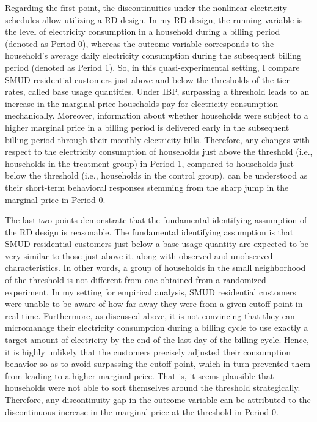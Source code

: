 Regarding the first point, the discontinuities under the nonlinear electricity schedules allow utilizing a RD design. In my RD design, the running variable is the level of electricity consumption in a household during a billing period (denoted as Period 0), whereas the outcome variable corresponds to the household's average daily electricity consumption during the subsequent billing period (denoted as Period 1). So, in this quasi-experimental setting, I compare SMUD residential customers just above and below the thresholds of the tier rates, called base usage quantities. Under IBP, surpassing a threshold leads to an increase in the marginal price households pay for electricity consumption mechanically. Moreover, information about whether households were subject to a higher marginal price in a billing period is delivered early in the subsequent billing period through their monthly electricity bills. Therefore, any changes with respect to the electricity consumption of households just above the threshold (i.e., households in the treatment group) in Period 1, compared to households just below the threshold (i.e., households in the control group), can be understood as their short-term behavioral responses stemming from the sharp jump in the marginal price in Period 0. 

The last two points demonstrate that the fundamental identifying assumption of the RD design is reasonable. The fundamental identifying assumption is that SMUD residential customers just below a base usage quantity are expected to be very similar to those just above it, along with observed and unobserved characteristics. In other words, a group of households in the small neighborhood of the threshold is not different from one obtained from a randomized experiment. In my setting for empirical analysis, SMUD residential customers were unable to be aware of how far away they were from a given cutoff point in real time. Furthermore, as discussed above, it is not convincing that they can micromanage their electricity consumption during a billing cycle to use exactly a target amount of electricity by the end of the last day of the billing cycle. Hence, it is highly unlikely that the customers precisely adjusted their consumption behavior so as to avoid surpassing the cutoff point, which in turn prevented them from leading to a higher marginal price. That is, it seems plausible that households were not able to sort themselves around the threshold strategically. Therefore, any discontinuity gap in the outcome variable can be attributed to the discontinuous increase in the marginal price at the threshold in Period 0. 

